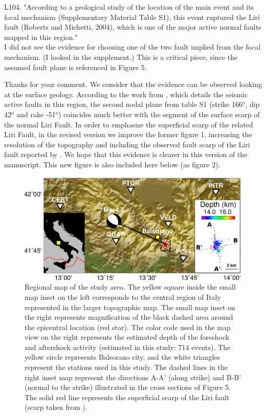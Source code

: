\documentclass[10pt]{extarticle}
\begin{document}
\begin{ReviewerComment}{1}
\noindent 
L104. "According to a geological study of the location of the main event and its focal mechanism (Supplementary Material Table S1), this event ruptured the Liri fault (Roberts and Michetti, 2004), which is one of the major active normal faults mapped in this region." \\

I did not see the evidence for choosing one of the two fault implied from the focal mechanism. (I looked in the supplement.) This is a critical piece, since the assumed fault plane is referenced in Figure 5.
\end{ReviewerComment}


\begin{Answer}
Thanks for your comment. We consider that the evidence can be observed looking at the surface geology. According to the work from \cite{Falcucci2016active}, which details the seismic active faults in this region, the second nodal plane from table S1 (strike 166$^o$, dip 42$^o$ and rake -51$^o$) coincides much better with the segment of the surface scarp of the normal Liri Fault. In order to emphasize the superficial scarp of the related Liri Fault, in the revised version we improve the former figure 1, increasing the resolution of the topography and including the observed fault scarp of the Liri fault reported by \cite{wedmore2017667}. We hope that this evidence is clearer in this version of the manuscript. This new figure is also included here below (as figure 2).
\begin{figure}[!h]
    \centering
     \includegraphics[width=1\linewidth]{map_balsorano.pdf}
    \caption{Regional map of the study area. The yellow square inside the small map inset on the left corresponds to the central region of Italy represented in the larger topographic map. The small map inset on the right represents magnification of the black dashed area around the epicentral location (red star). The color code used in the map view on the right represents the estimated depth of the foreshock and aftershock activity (estimated in this study: 714 events). The yellow circle represents Balsorano city, and the white triangles represent the stations used in this study. The dashed lines in the right inset map represent the directions A-A' (along strike) and B-B' (normal to the strike) illustrated in the cross sections of Figure 5. The solid red line represents the superficial scarp of the Liri fault (scarp taken from \cite{wedmore2017667}).}
\end{figure}
 \WorkInProgressRevTask
\end{Answer}
\end{document}
